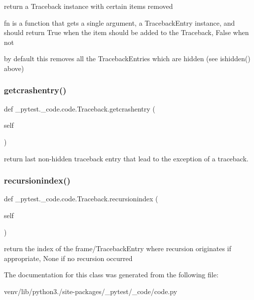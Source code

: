 \begin{DoxyVerb}return a Traceback instance with certain items removed

    fn is a function that gets a single argument, a TracebackEntry
    instance, and should return True when the item should be added
    to the Traceback, False when not

    by default this removes all the TracebackEntries which are hidden
    (see ishidden() above)
\end{DoxyVerb}
 \mbox{\label{class__pytest_1_1__code_1_1code_1_1_traceback_ab8f83d3614989f22fcd2ec680554d516}} 
\subsubsection{\texorpdfstring{getcrashentry()}{getcrashentry()}}
{\footnotesize\ttfamily def \+\_\+pytest.\+\_\+code.\+code.\+Traceback.\+getcrashentry (\begin{DoxyParamCaption}\item[{}]{self }\end{DoxyParamCaption})}

\begin{DoxyVerb}return last non-hidden traceback entry that lead
to the exception of a traceback.
\end{DoxyVerb}
 \mbox{\label{class__pytest_1_1__code_1_1code_1_1_traceback_a22bcd0c12c4313b424601ec1e4d1a7df}} 
\subsubsection{\texorpdfstring{recursionindex()}{recursionindex()}}
{\footnotesize\ttfamily def \+\_\+pytest.\+\_\+code.\+code.\+Traceback.\+recursionindex (\begin{DoxyParamCaption}\item[{}]{self }\end{DoxyParamCaption})}

\begin{DoxyVerb}return the index of the frame/TracebackEntry where recursion
    originates if appropriate, None if no recursion occurred
\end{DoxyVerb}
 

The documentation for this class was generated from the following file\+:\begin{DoxyCompactItemize}
\item 
venv/lib/python3./site-\/packages/\+\_\+pytest/\+\_\+code/code.\+py\end{DoxyCompactItemize}
